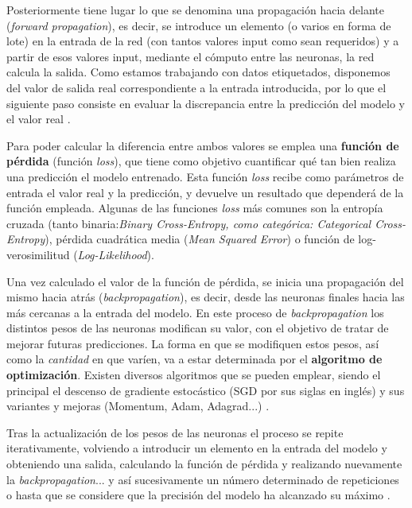 Posteriormente tiene lugar lo que se denomina una propagación hacia delante (\textit{forward propagation}), es decir, se introduce un elemento (o varios en forma de lote) en la entrada de la red (con tantos valores input como sean requeridos) y a partir de esos valores input, mediante el cómputo entre las neuronas, la red calcula la salida. Como estamos trabajando con datos etiquetados, disponemos del valor de salida real correspondiente a la entrada introducida, por lo que el siguiente paso consiste en evaluar la discrepancia entre la predicción del modelo y el valor real \cite{cnn:biblia_deeplearning,cnn:biblia_machinelearning}.

Para poder calcular la diferencia entre ambos valores se emplea una \textbf{función de pérdida} (función \textit{loss}), que tiene como objetivo cuantificar qué tan bien realiza una predicción el modelo entrenado. Esta función \textit{loss} recibe como parámetros de entrada el valor real y la predicción, y devuelve un resultado que dependerá de la función empleada.  Algunas de las funciones \textit{loss} más comunes son la entropía cruzada (tanto binaria:\textit{Binary Cross-Entropy, como categórica: Categorical Cross-Entropy}), pérdida cuadrática media (\textit{Mean Squared Error}) o función de log-verosimilitud (\textit{Log-Likelihood})\cite{cnn:biblia_deeplearning}.

Una vez calculado el valor de la función de pérdida, se inicia una propagación del mismo hacia atrás (\textit{backpropagation}), es decir, desde las neuronas finales hacia las más cercanas a la entrada del modelo. En este proceso de \textit{backpropagation} los distintos pesos de las neuronas modifican su valor, con el objetivo de tratar de mejorar futuras predicciones. La forma en que se modifiquen estos pesos, así como la \textit{cantidad} en que varíen, va a estar determinada por el \textbf{algoritmo de optimización}. Existen diversos algoritmos que se pueden emplear, siendo el principal el descenso de gradiente estocástico (SGD por sus siglas en inglés) y sus variantes y mejoras (Momentum, Adam, Adagrad...) \cite{cnn:biblia_deeplearning,cnn:biblia_machinelearning}.

Tras la actualización de los pesos de las neuronas el proceso se repite iterativamente, volviendo a introducir un elemento en la entrada del modelo y obteniendo una salida, calculando la función de pérdida y realizando nuevamente la \textit{backpropagation}... y así sucesivamente un número determinado de repeticiones o hasta que se considere que la precisión del modelo ha alcanzado su máximo \cite{cnn:biblia_deeplearning}.

